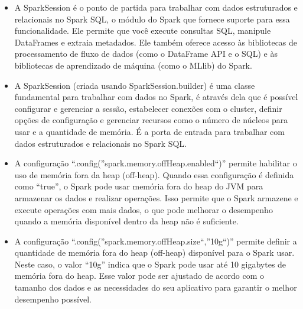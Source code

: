 \documentclass[11pt]{article}
\begin{document}
\begin{itemize}
\item
  A SparkSession é o ponto de partida para trabalhar com dados
  estruturados e relacionais no Spark SQL, o módulo do Spark que fornece
  suporte para essa funcionalidade. Ele permite que você execute
  consultas SQL, manipule DataFrames e extraia metadados. Ele também
  oferece acesso às bibliotecas de processamento de fluxo de dados (como
  o DataFrame API e o SQL) e às bibliotecas de aprendizado de máquina
  (como o MLlib) do Spark.
\item
  A SparkSession (criada usando SparkSession.builder) é uma classe
  fundamental para trabalhar com dados no Spark, é através dela que é
  possível configurar e gerenciar a sessão, estabelecer conexões com o
  cluster, definir opções de configuração e gerenciar recursos como o
  número de núcleos para usar e a quantidade de memória. É a porta de
  entrada para trabalhar com dados estruturados e relacionais no Spark
  SQL.
\item
  A configuração ``.config(''spark.memory.offHeap.enabled``)'' permite
  habilitar o uso de memória fora da heap (off-heap). Quando essa
  configuração é definida como ``true'', o Spark pode usar memória fora
  do heap do JVM para armazenar os dados e realizar operações. Isso
  permite que o Spark armazene e execute operações com mais dados, o que
  pode melhorar o desempenho quando a memória disponível dentro da heap
  não é suficiente.
\item
  A configuração ``.config(''spark.memory.offHeap.size``,''10g``)''
  permite definir a quantidade de memória fora do heap (off-heap)
  disponível para o Spark usar. Neste caso, o valor ``10g'' indica que o
  Spark pode usar até 10 gigabytes de memória fora do heap. Esse valor
  pode ser ajustado de acordo com o tamanho dos dados e as necessidades
  do seu aplicativo para garantir o melhor desempenho possível.
\end{itemize}
\end{document}
